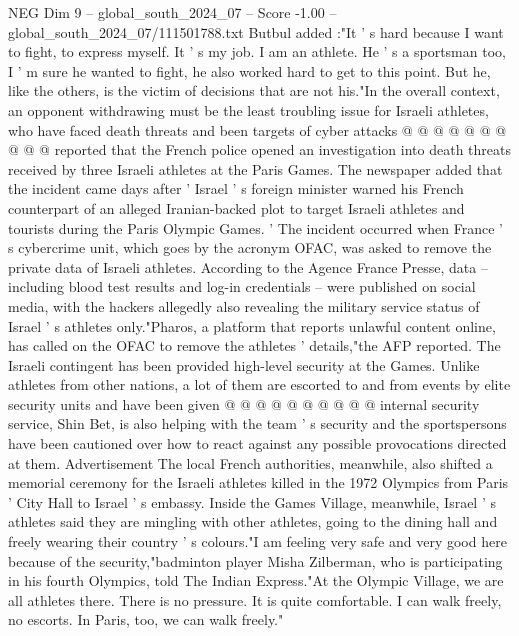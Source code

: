 \begin{textsample}{NEG Dim 9 – global\_south\_2024\_07 – Score -1.00 – global\_south\_2024\_07/111501788.txt}
Butbul added :"It ' s hard because I want to fight, to express myself.
It ' s my job.
I am an athlete.
He ' s a sportsman too, I ' m sure he wanted to fight, he also worked hard to get to this point.
But he, like the others, is the victim of decisions that are not his."In the overall context, an opponent withdrawing must be the least troubling issue for Israeli athletes, who have faced death threats and been targets of cyber attacks @ @ @ @ @ @ @ @ @ @ reported that the French police opened an investigation into death threats received by three Israeli athletes at the Paris Games.
The newspaper added that the incident came days after ' Israel ' s foreign minister warned his French counterpart of an alleged Iranian-backed plot to target Israeli athletes and tourists during the Paris Olympic Games. ' The incident occurred when France ' s cybercrime unit, which goes by the acronym OFAC, was asked to remove the private data of Israeli athletes.
According to the Agence France Presse, data -- including blood test results and log-in credentials -- were published on social media, with the hackers allegedly also revealing the military service status of Israel ' s athletes only."Pharos, a platform that reports unlawful content online, has called on the OFAC to remove the athletes ' details,"the AFP reported.
The Israeli contingent has been provided high-level security at the Games.
Unlike athletes from other nations, a lot of them are escorted to and from events by elite security units and have been given @ @ @ @ @ @ @ @ @ @ internal security service, Shin Bet, is also helping with the team ' s security and the sportspersons have been cautioned over how to react against any possible provocations directed at them.
Advertisement The local French authorities, meanwhile, also shifted a memorial ceremony for the Israeli athletes killed in the 1972 Olympics from Paris ' City Hall to Israel ' s embassy.
Inside the Games Village, meanwhile, Israel ' s athletes said they are mingling with other athletes, going to the dining hall and freely wearing their country ' s colours."I am feeling very safe and very good here because of the security,"badminton player Misha Zilberman, who is participating in his fourth Olympics, told The Indian Express."At the Olympic Village, we are all athletes there.
There is no pressure.
It is quite comfortable.
I can walk freely, no escorts.
In Paris, too, we can walk freely."

\end{textsample}
